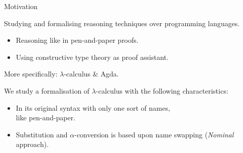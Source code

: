 \documentclass[utf,utf8x,hyperref=hidelinks,xcolor=table]{beamer} %
\newcommand{\alp}{\ensuremath{\alpha}}
\begin{document}
\begin{frame}{Motivation}
\begin{block}{}
  Studying and formalising reasoning techniques over programming languages.
  \begin{itemize}
  \item Reasoning like in pen-and-paper proofs.
  \item Using constructive type theory as proof assistant.
  \end{itemize}

  More specifically: $\lambda$-calculus \& Agda.
\end{block}

\pause

\bigskip

We study a formalisation of $\lambda$-calculus with the following characteristics:

\begin{itemize}
\item In its original syntax with only one sort of names, \\  like pen-and-paper.
\item Substitution  and \alp-conversion is based upon name swapping (\emph{Nominal} approach).
\end{itemize}






\end{frame}
\end{document}

